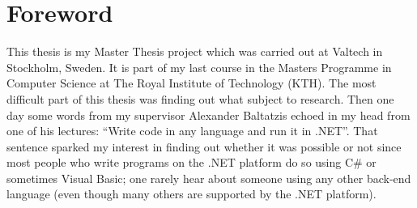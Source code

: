 \chapter*{Foreword}

This thesis is my Master Thesis project which was carried out at Valtech in Stockholm, Sweden. It is part of my last course in the Masters Programme in Computer Science at The Royal Institute of Technology (KTH). The most difficult part of this thesis was finding out what subject to research. Then one day some words from my supervisor Alexander Baltatzis echoed in my head from one of his lectures: ``Write code in any language and run it in .NET''. That sentence sparked my interest in finding out whether it was possible or not since most people who write programs on the .NET platform do so using C\# or sometimes Visual Basic; one rarely hear about someone using any other back-end language (even though many others are supported by the .NET platform).